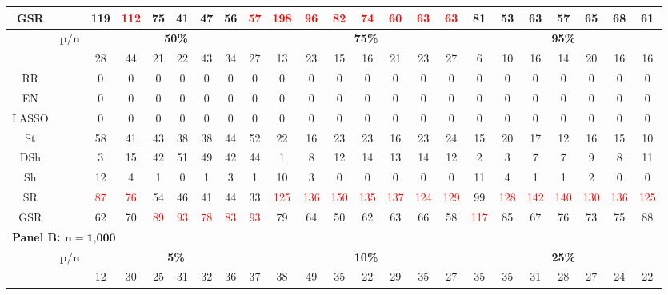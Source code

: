\begin{table}
{\begin{tabular*}{\textwidth}{@{\extracolsep{\fill}}cc|ccccccc|ccccccc|ccccccc@{}}
GSR &  & 119 & \textcolor{red}{112} & 75 & 41 & 47 & 56 & \textcolor{red}{57} & \textcolor{red}{198} & \textcolor{red}{96} & \textcolor{red}{82} & \textcolor{red}{74} & \textcolor{red}{60} & \textcolor{red}{63} & \textcolor{red}{63} & 81 & 53 & 63 & 57 & 65 & 68 & 61 \\
\hline
\multirow{2}{*}{} & $\bm{p/n}$ & \multicolumn{7}{c|}{\textbf{50\%}} & \multicolumn{7}{c|}{\textbf{75\%}} & \multicolumn{7}{c}{\textbf{95\%}} \\
\hline
OLS &  & 28 & 44 & 21 & 22 & 43 & 34 & 27 & 13 & 23 & 15 & 16 & 21 & 23 & 27 & 6 & 10 & 16 & 14 & 20 & 16 & 16 \\
RR &  & 0 & 0 & 0 & 0 & 0 & 0 & 0 & 0 & 0 & 0 & 0 & 0 & 0 & 0 & 0 & 0 & 0 & 0 & 0 & 0 & 0 \\
EN &  & 0 & 0 & 0 & 0 & 0 & 0 & 0 & 0 & 0 & 0 & 0 & 0 & 0 & 0 & 0 & 0 & 0 & 0 & 0 & 0 & 0 \\
LASSO &  & 0 & 0 & 0 & 0 & 0 & 0 & 0 & 0 & 0 & 0 & 0 & 0 & 0 & 0 & 0 & 0 & 0 & 0 & 0 & 0 & 0 \\
St &  & 58 & 41 & 43 & 38 & 38 & 44 & 52 & 22 & 16 & 23 & 23 & 16 & 23 & 24 & 15 & 20 & 17 & 12 & 16 & 15 & 10 \\
DSh &  & 3 & 15 & 42 & 51 & 49 & 42 & 44 & 1 & 8 & 12 & 14 & 13 & 14 & 12 & 2 & 3 & 7 & 7 & 9 & 8 & 11 \\
Sh &  & 12 & 4 & 1 & 0 & 1 & 3 & 1 & 10 & 3 & 0 & 0 & 0 & 0 & 0 & 11 & 4 & 1 & 1 & 2 & 0 & 0 \\
SR &  & \textcolor{red}{87} & \textcolor{red}{76} & 54 & 46 & 41 & 44 & 33 & \textcolor{red}{125} & \textcolor{red}{136} & \textcolor{red}{150} & \textcolor{red}{135} & \textcolor{red}{137} & \textcolor{red}{124} & \textcolor{red}{129} & 99 & \textcolor{red}{128} & \textcolor{red}{142} & \textcolor{red}{140} & \textcolor{red}{130} & \textcolor{red}{136} & \textcolor{red}{125} \\
GSR &  & 62 & 70 & \textcolor{red}{89} & \textcolor{red}{93} & \textcolor{red}{78} & \textcolor{red}{83} & \textcolor{red}{93} & 79 & 64 & 50 & 62 & 63 & 66 & 58 & \textcolor{red}{117} & 85 & 67 & 76 & 73 & 75 & 88 \\
\hline
\multicolumn{23}{l}{\textbf{Panel B: $\bm{n}=\textbf{1,000}$}} \\
\hline
\multirow{2}{*}{} & $\bm{p/n}$ & \multicolumn{7}{c|}{\textbf{5\%}} & \multicolumn{7}{c|}{\textbf{10\%}} & \multicolumn{7}{c}{\textbf{25\%}} \\
\hline
OLS &  & 12 & 30 & 25 & 31 & 32 & 36 & 37 & 38 & 49 & 35 & 22 & 29 & 35 & 27 & 35 & 35 & 31 & 28 & 27 & 24 & 22 \\

\end{tabular*}}
\end{table}
